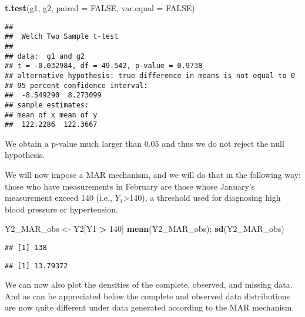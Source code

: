 \documentclass[
]{article}
\newenvironment{Shaded}{\begin{snugshade}}{\end{snugshade}}
\newcommand{\AttributeTok}[1]{\textcolor[rgb]{0.13,0.29,0.53}{#1}}
\newcommand{\ConstantTok}[1]{\textcolor[rgb]{0.56,0.35,0.01}{#1}}
\newcommand{\DecValTok}[1]{\textcolor[rgb]{0.00,0.00,0.81}{#1}}
\newcommand{\FunctionTok}[1]{\textcolor[rgb]{0.13,0.29,0.53}{\textbf{#1}}}
\newcommand{\NormalTok}[1]{#1}
\newcommand{\OtherTok}[1]{\textcolor[rgb]{0.56,0.35,0.01}{#1}}
\newcommand{\SpecialCharTok}[1]{\textcolor[rgb]{0.81,0.36,0.00}{\textbf{#1}}}
\begin{document}
\begin{Shaded}
\begin{Highlighting}[]
\FunctionTok{t.test}\NormalTok{(g1, g2, }\AttributeTok{paired =} \ConstantTok{FALSE}\NormalTok{, }\AttributeTok{var.equal =} \ConstantTok{FALSE}\NormalTok{)}
\end{Highlighting}
\end{Shaded}

\begin{verbatim}
## 
##  Welch Two Sample t-test
## 
## data:  g1 and g2
## t = -0.032984, df = 49.542, p-value = 0.9738
## alternative hypothesis: true difference in means is not equal to 0
## 95 percent confidence interval:
##  -8.549290  8.273099
## sample estimates:
## mean of x mean of y 
##  122.2286  122.3667
\end{verbatim}

We obtain a p-value much larger than \(0.05\) and thus we do not reject
the null hypothesis.

We will now impose a MAR mechanism, and we will do that in the following
way: those who have measurements in February are those whose January's
measurement exceed 140 (i.e., \(Y_1\)\textgreater140), a threshold used
for diagnosing high blood pressure or hypertension.

\begin{Shaded}
\begin{Highlighting}[]
\NormalTok{Y2\_MAR\_obs }\OtherTok{\textless{}{-}}\NormalTok{ Y2[Y1 }\SpecialCharTok{\textgreater{}} \DecValTok{140}\NormalTok{] }
\FunctionTok{mean}\NormalTok{(Y2\_MAR\_obs); }\FunctionTok{sd}\NormalTok{(Y2\_MAR\_obs)}
\end{Highlighting}
\end{Shaded}

\begin{verbatim}
## [1] 138
\end{verbatim}

\begin{verbatim}
## [1] 13.79372
\end{verbatim}

We can now also plot the densities of the complete, observed, and
missing data. And as can be appreciated below the complete and observed
data distributions are now quite different under data generated
according to the MAR mechanism.
\end{document}
